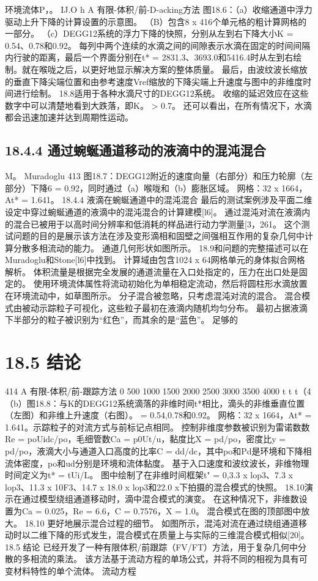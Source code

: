 \documentclass[UTF8,11pt,a4paper,openany,fontset=fandol]{ctexbook}
\begin{document}
环境流体P，。 IJ.O h A 有限-体积/前-D-acking方法 图18.6：（a）收缩通道中浮力驱动上升下降的计算设置的示意图。 （B）包含8 x 416个单元格的粗计算网格的一部分。 （c）DEGG12系统的浮力下降的快照，分别从左到右下降大小K = 0.54、0.78和0.92。 每列中两个连续的水滴之间的间隙表示水滴在固定的时间间隔内行驶的距离，最后一个界面分别在t* = 2831.3、3693.0和5416.4时从左到右绘制。就在喉咙之后，以更好地显示解决方案的整体质量。 最后，由波纹波长缩放的垂直下降尖端位置和由参考速度Vref缩放的下降尖端上升速度与图中的非维度时间进行绘制。 18.8适用于各种水滴尺寸的DEGG12系统。 收缩的延迟效应在这些数字中可以清楚地看到大跌落，即K。 > 0.7。 还可以看出，在所有情况下，水滴都会迅速加速并达到周期性运动。

\subsection{18.4.4 通过蜿蜒通道移动的液滴中的混沌混合}
M。 Muradoglu 413 图18.7：DEGG12附近的速度向量（右部分）和压力轮廓（左部分）下降6 = 0.92，同时通过（a）喉咙和（b）膨胀区域。 网格：32 x 1664，At* = 1.641。 18.4.4 液滴在蜿蜒通道中的混沌混合 最后的测试案例涉及平面二维设定中穿过蜿蜒通道的液滴中的混沌混合的计算建模[l6]。 通过混沌对流在液滴内的混合已被用于以高时间分辨率和低消耗的样品进行动力学测量[3，261。 这个测试问题的目的是展示该方法在涉及变形滴相和固壁之间强相互作用的复杂几何中计算分散多相流动的能力。 通道几何形状如图所示。 18.9和问题的完整描述可以在Muradoglu和Stone[l6]中找到。 计算域由包含1024 x 64网格单元的身体拟合网格解析。 体积流量是根据完全发展的通道流量在入口处指定的，压力在出口处是固定的。 使用环境流体属性将流动初始化为单相稳定流动，然后将圆柱形水滴放置在环境流动中，如草图所示。 分子混合被忽略，只考虑混沌对流的混合。 混合模式由被动示踪粒子可视化，这些粒子最初在液滴内随机均匀分布。 最初占据液滴下半部分的粒子被识别为“红色”，而其余的是“蓝色”。 足够的

\section{18.5 结论}
414 A 有限-体积/前-跟踪方法 0 500 1000 1500 2000 2500 3000 3500 4000 t t t（4（b）图18.8：与K的DEGG12系统滴落的非维时间t*相比，滴头的非维垂直位置（左图）和非维上升速度（右图）。 = 0.54,0.78和0.92。 网格：32 x 1664，At* = 1.641。示踪粒子的对流方式与前标记点相同。 控制非维度参数被识别为雷诺数数Re = poUidc/po，毛细管数Ca = p0Ut/u，黏度比X = pd/po，密度比y = pd/po，液滴大小与通道入口高度的比率C = dd/dc，其中po和Pd是环境和下降相流体密度，po和ud分别是环境和流体黏度。 基于入口速度和波纹波长，非维物理时间定义为t* = tUi/L。 图中绘制了在非维时间框架t" = 0,3.3 x lop3、7.3 x lop3、11.3 x 10F3、14.7 x 18.0 x lop3和22.0 x下拍摄的混合模式的快照。 18.10演示在通过模型绕组通道移动时，滴中混合模式的演变。 在这种情况下，非维数设置为Ca = 0.025，Re = 6.6，C = 0.7576，X = 1.0。 混合模式在图的顶部图中放大。 18.10 更好地展示混合过程的细节。 如图所示，混沌对流在通过绕组通道移动时以二维下降的形式发生，混合模式在质量上与实际的三维混合模式相似[20]。 18.5 结论 已经开发了一种有限体积/前跟踪（FV/FT）方法，用于复杂几何中分散的多相流的乘法。 该方法基于流动方程的单场公式，并将不同的相视为具有可变材料特性的单个流体。 流动方程
\end{document}
